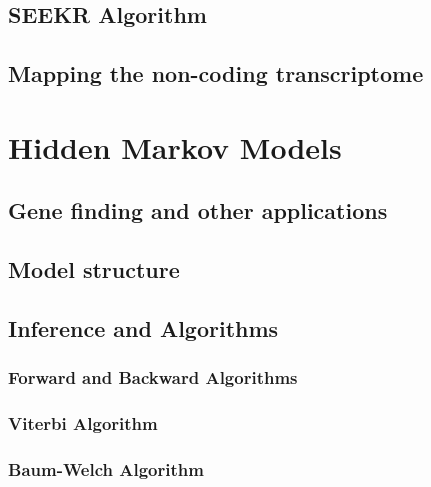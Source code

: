 \subsection{SEEKR Algorithm}
\lipsum[1-2]
\subsection{Mapping the non-coding transcriptome}
\lipsum[1-2]

\section{Hidden Markov Models}
\lipsum[1-2]
\subsection{Gene finding and other applications}
\lipsum[1-2]
\subsection{Model structure}
\lipsum[1-2]
\subsection{Inference and Algorithms}
\lipsum[1-2]
\subsubsection{Forward and Backward Algorithms}
\lipsum[1-2]
\subsubsection{Viterbi Algorithm}
\lipsum[1-2]
\subsubsection{Baum-Welch Algorithm}
\lipsum[1-2]
